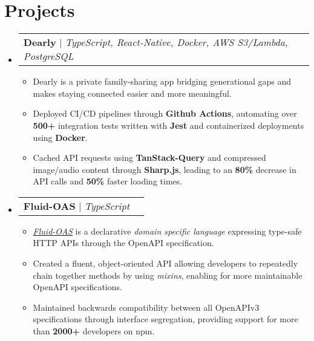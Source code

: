\documentclass[letterpaper,11pt]{article}
\makeatletter
\newcommand{\resumeItem}[1]{
  \item\small{
    {#1 \vspace{-2pt}}
  }
}
\newcommand{\resumeProjectHeading}[2]{
    \item
    \begin{tabular*}{0.97\textwidth}{l@{\extracolsep{\fill}}r}
      \small#1 & #2 \\
    \end{tabular*}\vspace{-7pt}
}
\newcommand{\resumeSubHeadingListStart}{\begin{itemize}[leftmargin=0.15in, label={}]}
\newcommand{\resumeSubHeadingListEnd}{\end{itemize}}
\newcommand{\resumeItemListStart}{\begin{itemize}}
\newcommand{\resumeItemListEnd}{\end{itemize}\vspace{-5pt}}
\makeatother
\begin{document}
\section{Projects}
\resumeSubHeadingListStart
\resumeProjectHeading
{\textbf{Dearly} $|$ \emph{TypeScript, React-Native, Docker, AWS S3/Lambda, PostgreSQL}}    {}
\resumeItemListStart
\resumeItem{Dearly is a private family-sharing app bridging generational gaps and makes staying connected easier and more meaningful.}
\resumeItem{Deployed CI/CD pipelines through \textbf{Github Actions}, automating over \textbf{500+} integration tests written with \textbf{Jest} and containerized deployments using \textbf{Docker}. }
\resumeItem{Cached API requests using \textbf{TanStack-Query} and compressed image/audio content through \textbf{Sharp.js}, leading to an \textbf{80\%} decrease in API calls and \textbf{50\%} faster loading times.}
\resumeItemListEnd
\resumeProjectHeading
{\textbf{Fluid-OAS} $|$ \emph{TypeScript}}    {}
\resumeItemListStart
\resumeItem { \href{https://github.com/stoneliuCS/fluid-oas}{\emph{Fluid-OAS}} is a declarative \emph{domain specific language} expressing type-safe HTTP APIs through the OpenAPI specification.  }
\resumeItem { Created a fluent, object-oriented API allowing developers to repeatedly chain together methods by using \emph{mixins}, enabling for more maintainable OpenAPI specifications. }
\resumeItem { Maintained backwards compatibility between all OpenAPIv3 specifications through interface segregation, providing support for more than \textbf{2000+} developers on npm. }

\resumeItemListEnd

\resumeSubHeadingListEnd


\end{document}
